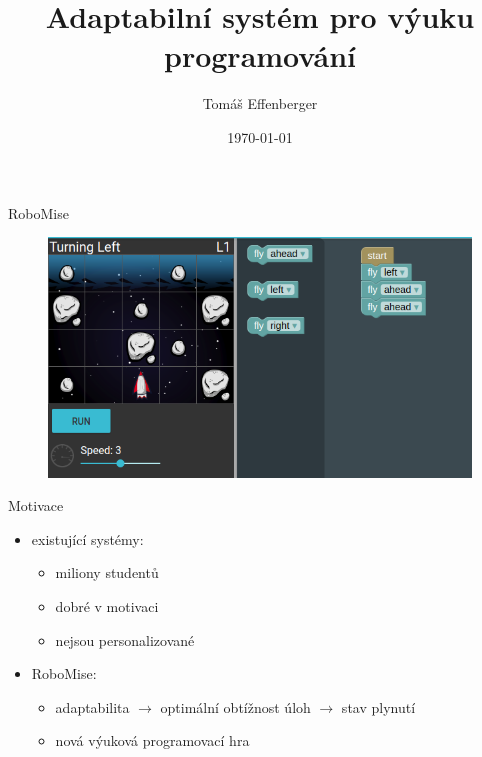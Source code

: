 \documentclass[
]{beamer}
\begin{document}
\title{Adaptabilní systém pro výuku programování}
\author[T.\,Effenberger]{Tomáš Effenberger} %
\date{\today}

\begin{frame}[plain]
\maketitle
\end{frame}



\begin{frame}{RoboMise}
\begin{figure}
\includegraphics[width=\textwidth,height=.65\textheight,keepaspectratio]{../img/robomission-task1}
\end{figure}
\end{frame}

\begin{frame}{Motivace}
\begin{itemize}
\item existující systémy:
\begin{itemize}
\item miliony studentů
\item dobré v motivaci
\item nejsou personalizované
\end{itemize}
\item RoboMise:
\begin{itemize}
\item adaptabilita $\rightarrow$ optimální obtížnost úloh $\rightarrow$ stav plynutí
\item nová výuková programovací hra
\end{itemize}
\end{itemize}
\end{frame}
\end{document}
